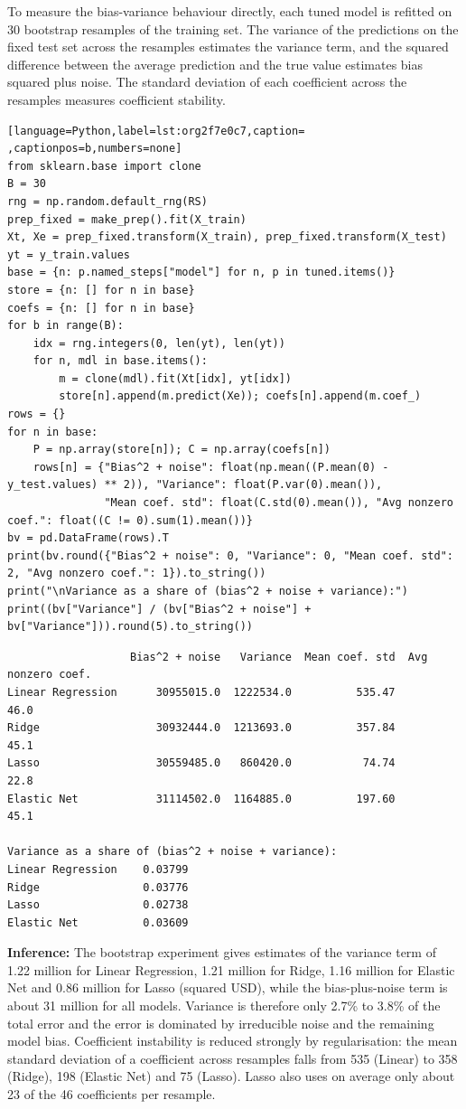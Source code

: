 \documentclass[11pt]{article}
\begin{document}
To measure the bias-variance behaviour directly, each tuned model is refitted on 30
bootstrap resamples of the training set. The variance of the predictions on the fixed test
set across the resamples estimates the variance term, and the squared difference between the
average prediction and the true value estimates bias squared plus noise. The standard
deviation of each coefficient across the resamples measures coefficient stability.
\begin{lstlisting}[language=Python,label=lst:org2f7e0c7,caption= ,captionpos=b,numbers=none]
from sklearn.base import clone
B = 30
rng = np.random.default_rng(RS)
prep_fixed = make_prep().fit(X_train)
Xt, Xe = prep_fixed.transform(X_train), prep_fixed.transform(X_test)
yt = y_train.values
base = {n: p.named_steps["model"] for n, p in tuned.items()}
store = {n: [] for n in base}
coefs = {n: [] for n in base}
for b in range(B):
    idx = rng.integers(0, len(yt), len(yt))
    for n, mdl in base.items():
        m = clone(mdl).fit(Xt[idx], yt[idx])
        store[n].append(m.predict(Xe)); coefs[n].append(m.coef_)
rows = {}
for n in base:
    P = np.array(store[n]); C = np.array(coefs[n])
    rows[n] = {"Bias^2 + noise": float(np.mean((P.mean(0) - y_test.values) ** 2)), "Variance": float(P.var(0).mean()),
               "Mean coef. std": float(C.std(0).mean()), "Avg nonzero coef.": float((C != 0).sum(1).mean())}
bv = pd.DataFrame(rows).T
print(bv.round({"Bias^2 + noise": 0, "Variance": 0, "Mean coef. std": 2, "Avg nonzero coef.": 1}).to_string())
print("\nVariance as a share of (bias^2 + noise + variance):")
print((bv["Variance"] / (bv["Bias^2 + noise"] + bv["Variance"])).round(5).to_string())
\end{lstlisting}

\begin{verbatim}
                   Bias^2 + noise   Variance  Mean coef. std  Avg nonzero coef.
Linear Regression      30955015.0  1222534.0          535.47               46.0
Ridge                  30932444.0  1213693.0          357.84               45.1
Lasso                  30559485.0   860420.0           74.74               22.8
Elastic Net            31114502.0  1164885.0          197.60               45.1

Variance as a share of (bias^2 + noise + variance):
Linear Regression    0.03799
Ridge                0.03776
Lasso                0.02738
Elastic Net          0.03609
\end{verbatim}

\textbf{Inference:} The bootstrap experiment gives estimates of the variance term of 1.22 million for Linear
Regression, 1.21 million for Ridge, 1.16 million for Elastic Net and 0.86 million for Lasso
(squared USD), while the bias-plus-noise term is about 31 million for all models. Variance
is therefore only 2.7\% to 3.8\% of the total error and the error is dominated by irreducible
noise and the remaining model bias. Coefficient instability is reduced strongly by
regularisation: the mean standard deviation of a coefficient across resamples falls from 535
(Linear) to 358 (Ridge), 198 (Elastic Net) and 75 (Lasso). Lasso also uses on average only
about 23 of the 46 coefficients per resample.
\end{document}
